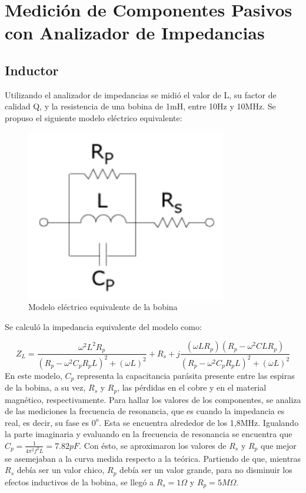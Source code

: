 



\onehalfspacing



\section{Medición de Componentes Pasivos con Analizador de Impedancias}
\subsection{Inductor}
Utilizando el analizador de impedancias se midió el valor de L, su factor de calidad Q, y la resistencia de una bobina de 1mH, entre 10Hz y 10MHz.
Se propuso el siguiente modelo eléctrico equivalente:

\begin{figure}[H]
\centering
\includegraphics[scale=0.5]{modeloL.png}
\caption{Modelo eléctrico equivalente de la bobina}
\label{fig:modeloL}
\end{figure}

Se calculó la impedancia equivalente del modelo como:

\begin{equation}
Z_L=\frac{\omega^2L^2R_p}{(R_p-\omega^2C_pR_pL)^2+(\omega L)^2}+R_s+j\frac{(\omega LR_p)(R_p-\omega^2 CLR_p)}{(R_p-\omega^2C_pR_pL)^2+(\omega L)^2}
\end{equation}
En este modelo, $C_p$  representa la capacitancia parásita presente entre las espiras de la bobina, a su vez, $R_s$ y $R_p$, las pérdidas en el cobre y en el material magnético, respectivamente.
Para hallar los valores de los componentes, se analiza de las mediciones la frecuencia de resonancia, que es cuando la impedancia es real, es decir, su fase es $0^o$. Esta se encuentra alrededor de los 1,8MHz.
Igualando la parte imaginaria y evaluando en la frecuencia de resonancia se encuentra que $C_p=\frac{1}{4\pi^2f^2L}=7.82pF$. Con ésto, se aproximaron los valores de $R_s$ y $R_p$ que mejor se asemejaban a la curva medida respecto a la teórica. Partiendo de que, mientras $R_s$ debía ser un valor chico, $R_p$ debía ser un valor grande, para no disminuir los efectos inductivos de la bobina, se llegó a $R_s=1\Omega$ y $R_p=5M\Omega$.


